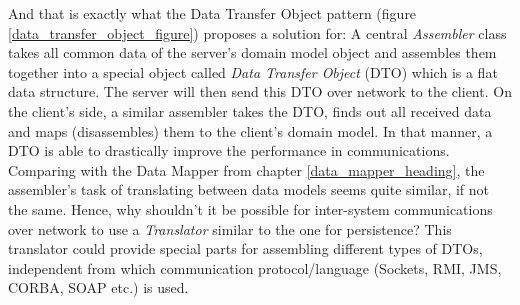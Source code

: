 And that is exactly what the Data Transfer Object pattern (figure
\ref{data_transfer_object_figure}) proposes a solution for: A central
\emph{Assembler} class takes all common data of the server's domain model object
and assembles them together into a special object called \emph{Data Transfer Object}
(DTO) which is a flat data structure.
The server will then send this DTO over network to the client. On the client's side,
a similar assembler takes the DTO, finds out all received data and maps (disassembles)
them to the client's domain model. In that manner, a DTO is able to drastically
improve the performance in communications.\\
Comparing with the Data Mapper from chapter \ref{data_mapper_heading}, the
assembler's task of translating between data models seems quite similar, if not
the same. Hence, why shouldn't it be possible for inter-system communications
over network to use a \emph{Translator} similar to the one for persistence?
This translator could provide special parts for assembling different types of
DTOs, independent from which communication protocol/language (Sockets, RMI, JMS,
CORBA, SOAP etc.) is used.

